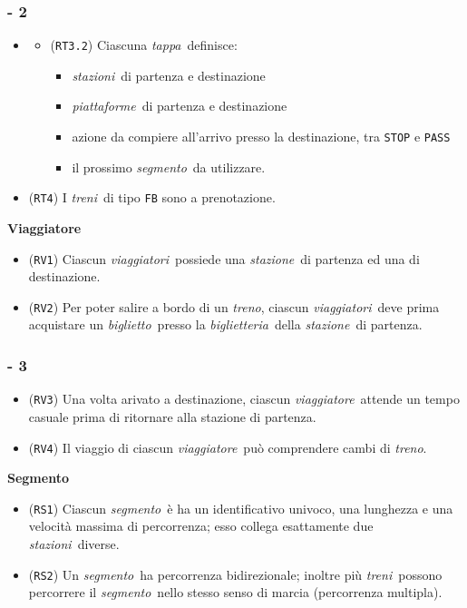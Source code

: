 \documentclass[slidestop,compress,blackandwhite]{beamer}
\newcommand{\ttt}[1]{\texttt{#1}}
\newcommand{\ii}[1]{\textit{#1}}
\newcommand{\treno}{\ii{treno}}
\newcommand{\treni}{\ii{treni}}
\newcommand{\viaggiatore}{\ii{viaggiatore}}
\newcommand{\viaggiatori}{\ii{viaggiatori}}
\newcommand{\stazione}{\ii{stazione}}
\newcommand{\stazioni}{\ii{stazioni}}
\newcommand{\piattaforme}{\ii{piattaforme}}
\newcommand{\ticket}{\ii{biglietto}}
\newcommand{\segmento}{\ii{segmento}}
\newcommand{\stage}{\ii{tappa}}
\newcommand{\biglietteria}{\ii{biglietteria}}
\newcommand{\itemt}[1]{\item (\ttt{#1})}
\begin{document}
	\begin{frame}
	
		\frametitle{ - 2}
		
		\begin{itemize}
			\item[]
			\begin{itemize} 
				\itemt{RT3.2} Ciascuna \stage~definisce:
				\begin{itemize}
					\item \stazioni~di partenza e destinazione
					\item \piattaforme~di partenza e destinazione
					\item azione da compiere all'arrivo presso la destinazione, tra \ttt{STOP} e \ttt{PASS}
					\item il prossimo \segmento~da utilizzare.
				\end{itemize}
			\end{itemize}
			\itemt{RT4} I \treni~di tipo \ttt{FB} sono a prenotazione.
		\end{itemize}
		\vspace{0.5cm}
		\textbf{Viaggiatore}
		\begin{itemize}
			\itemt{RV1} Ciascun \viaggiatori~possiede una \stazione~di partenza ed una di destinazione.
			\itemt{RV2} Per poter salire a bordo di un \treno, ciascun \viaggiatori~deve prima acquistare un \ticket~presso la \biglietteria~della \stazione~di partenza.
		\end{itemize}
	\end{frame}

	\begin{frame}
		\frametitle{ - 3}
		\begin{itemize}
			\itemt{RV3} Una volta arivato a destinazione, ciascun \viaggiatore~attende un tempo casuale prima di ritornare alla stazione di partenza.
			\itemt{RV4} Il viaggio di ciascun \viaggiatore~può comprendere cambi di \treno.
		\end{itemize}
		\vspace{0.5cm}
		\textbf{Segmento}
		\begin{itemize}
			\itemt{RS1} Ciascun \segmento~è ha un identificativo univoco, una lunghezza e una velocità massima di percorrenza; esso collega esattamente due \stazioni~diverse.
			\itemt{RS2} Un \segmento~ha percorrenza bidirezionale; inoltre più \treni~possono percorrere il \segmento~nello stesso senso di marcia (percorrenza multipla).  
		\end{itemize}
	\end{frame}
\end{document}
